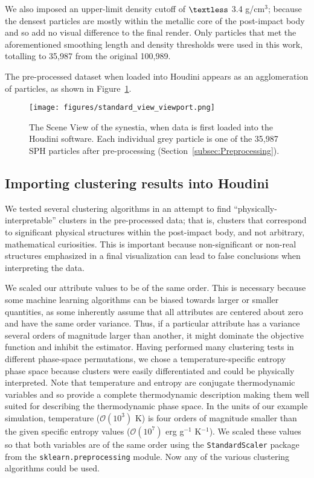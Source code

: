 \documentclass[fleqn,usenatbib,useAMS]{mnras}
\begin{document}
We also imposed an upper-limit density cutoff of $\textless$ 3.4 g/cm$^{3}$; because the densest particles are mostly within the metallic core of the post-impact body and so add no visual difference to the final render. Only particles that met the aforementioned smoothing length and density thresholds were used in this work, totalling to 35,987 from the original 100,989. \par

The pre-processed dataset when loaded into Houdini appears as an agglomeration of particles, as shown in Figure~\ref{fig:synestia_viewport}.
%
\begin{figure}
\centering
\texttt{[image: figures/standard\_view\_viewport.png]}
\caption{The Scene View of the synestia, when data is first loaded into the Houdini software. Each individual grey particle is one of the 35,987 SPH particles after pre-processing (Section~\ref{subsec:Preprocessing}).}
\label{fig:synestia_viewport}
\end{figure}
%

\subsection{Importing clustering results into Houdini}

We tested several clustering algorithms in an attempt to find ``physically-interpretable'' clusters in the pre-processed data; that is, clusters that correspond to significant physical structures within the post-impact body, and not arbitrary, mathematical curiosities. This is important because non-significant or non-real structures emphasized in a final visualization can lead to false conclusions when interpreting the data. \par

We scaled our attribute values to be of the same order. This is necessary because some machine learning algorithms can be biased towards larger or smaller quantities, as some inherently assume that all attributes are centered about zero and have the same order variance. Thus, if a particular attribute has a variance several orders of magnitude larger than another, it might dominate the objective function and inhibit the estimator. Having performed many clustering tests in different phase-space permutations, we chose a temperature-specific entropy phase space because clusters were easily differentiated and could be physically interpreted. Note that temperature and entropy are conjugate thermodynamic variables and so provide a complete thermodynamic description making them well suited for describing the thermodynamic phase space. In the units of our example simulation, temperature ($\mathcal{O}(10^3)$ K) is four orders of magnitude smaller than the given specific entropy values ($\mathcal{O}(10^7)$ erg g$^{-1}$ K$^{-1}$). We scaled these values so that both variables are of the same order using the \texttt{StandardScaler} package from the \texttt{sklearn.preprocessing} module. Now any of the various clustering algorithms could be used. 
\end{document}
